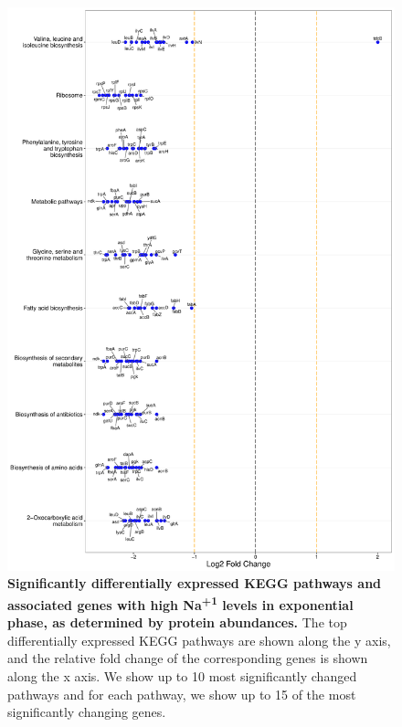 \documentclass[a4paper]{article}
\begin{document}
\clearpage
\begin{figure}
	\includegraphics[width=1.0\textwidth]{../../d_figures/kegg_14.pdf}
	\caption[Significantly altered KEGG pathways for protein samples in exponential phase tested for high Na\textsuperscript{+1} against base Na\textsuperscript{+1}]
	{\textbf{Significantly differentially expressed KEGG pathways and associated genes with high Na\textsuperscript{+1} levels in exponential phase, as determined by protein abundances.} The top differentially expressed KEGG pathways are shown along the y axis, and the relative fold change of the corresponding genes is shown along the x axis. We show up to 10 most significantly changed pathways and for each pathway, we show up to 15 of the most significantly changing genes.}
\end{figure}
\end{document}
